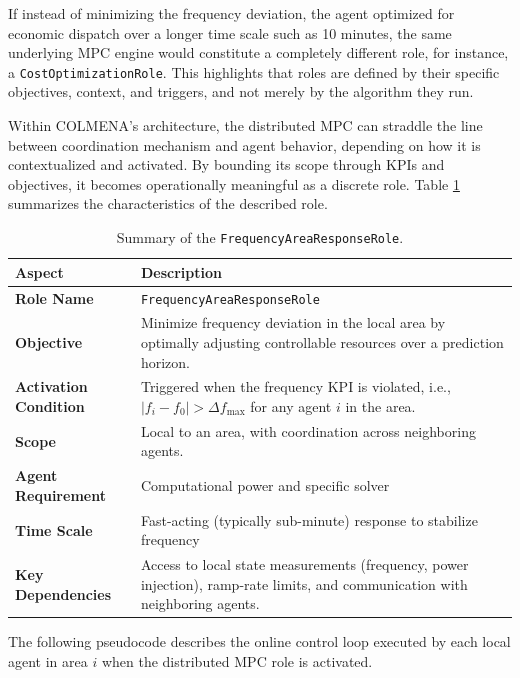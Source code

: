 \documentclass{article}
\begin{document}
If instead of minimizing the frequency deviation, the agent optimized for economic dispatch over a longer time scale such as 10 minutes, the same underlying MPC engine would constitute a completely different role, for instance, a \texttt{CostOptimizationRole}. This highlights that roles are defined by their specific objectives, context, and triggers, and not merely by the algorithm they run.

Within COLMENA's architecture, the distributed MPC can straddle the line between coordination mechanism and agent behavior, depending on how it is contextualized and activated. By bounding its scope through KPIs and objectives, it becomes operationally meaningful as a discrete role. Table \ref{tab:frequency_area_response_role} summarizes the characteristics of the described role. 

\begin{table}[h!]
\centering
\begin{tabular}{|p{3cm}|p{8cm}|}
\hline
\textbf{Aspect} & \textbf{Description} \\
\hline
\textbf{Role Name} & \texttt{FrequencyAreaResponseRole} \\
\hline
\textbf{Objective} & Minimize frequency deviation in the local area by optimally adjusting controllable resources over a prediction horizon. \\
\hline
\textbf{Activation Condition} & Triggered when the frequency KPI is violated, i.e., $|f_i - f_0| > \Delta f_{\text{max}}$ for any agent $i$ in the area. \\
\hline
\textbf{Scope} & Local to an area, with coordination across neighboring agents. \\
\hline
\textbf{Agent Requirement} & Computational power and specific solver\\
\hline
\textbf{Time Scale} & Fast-acting (typically sub-minute) response to stabilize frequency\\
\hline
\textbf{Key Dependencies} & Access to local state measurements (frequency, power injection), ramp-rate limits, and communication with neighboring agents. \\
\hline
\end{tabular}
\caption{Summary of the \texttt{FrequencyAreaResponseRole}.}
\label{tab:frequency_area_response_role}
\end{table}

The following pseudocode describes the online control loop executed by each local agent in area $i$ when the distributed MPC role is activated.
\end{document}
